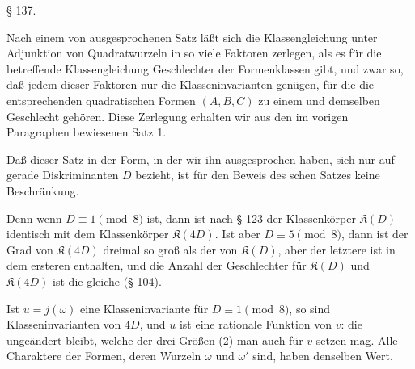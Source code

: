 

\begin{center}
§ 137.\quad {}
\end{center}

Nach einem von  ausgesprochenen Satz läßt sich die Klassengleichung unter Adjunktion von Quadratwurzeln in so viele Faktoren zerlegen, als es für die betreffende Klassengleichung Geschlechter der Formenklassen gibt, und zwar so, daß jedem dieser Faktoren nur die Klasseninvarianten genügen, für die die entsprechenden quadratischen Formen $(A,B,C)$ zu einem und demselben Geschlecht gehören. Diese Zerlegung erhalten wir aus den im vorigen Paragraphen bewiesenen Satz 1. %

Daß dieser Satz in der Form, in der wir ihn ausgesprochen haben, sich nur auf gerade Diskriminanten $D$ bezieht, ist für den Beweis des schen Satzes keine Beschränkung.

Denn wenn $D\equiv 1\pmod 8$ ist, dann ist nach § 123 der Klassenkörper $\mathfrak{K}(D)$ identisch mit dem Klassenkörper $\mathfrak{K}(4D)$. Ist aber $D\equiv 5\pmod 8$, dann ist der Grad von $\mathfrak{K}(4D)$ dreimal so groß als der von $\mathfrak{K}(D)$, aber der letztere ist in dem ersteren enthalten, und die Anzahl der Geschlechter für $\mathfrak{K}(D)$ und $\mathfrak{K}(4D)$ ist die gleiche (§ 104).

Ist $u=j(\omega)$ eine Klasseninvariante für $D\equiv 1\pmod 8$, so sind
Klasseninvarianten von $4D$, und $u$ ist eine rationale Funktion von $v$:
die ungeändert bleibt, welche der drei Größen (2) man auch für $v$ setzen mag. %
Alle Charaktere der Formen, deren Wurzeln $\omega$ und $\omega'$ sind, haben denselben Wert.
